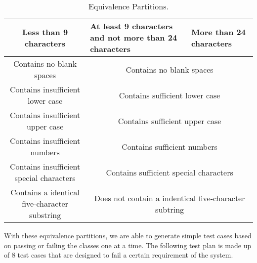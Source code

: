 \documentclass[12pt,letterpaper]{article}
\begin{document}
\begin{table}[h!]
  \begin{center}
    \caption{Equivalence Partitions.}
    \label{tab:Equiv partitions}
    
    \begin{tabular}{||c|m{4cm}|m{5cm}||}
    \hline
    Less than 9 characters & At least 9 characters and not more than 24
    characters & More than 24 characters \\
    
    \hline \hline
    \multicolumn{1}{||c|}{Contains no blank spaces} & \multicolumn{2}{c||}{Contains no blank spaces} \\
    
    \hline \hline
    \multicolumn{1}{||c|}{Contains insufficient lower case} 
    & \multicolumn{2}{c||}{Contains sufficient lower case} \\
    
    \hline \hline
    \multicolumn{1}{||c|}{Contains insufficient upper case} 
    & \multicolumn{2}{c||}{Contains sufficient upper case} \\
    
    \hline \hline
    \multicolumn{1}{||c|}{Contains insufficient numbers} 
    & \multicolumn{2}{c||}{Contains sufficient numbers} \\
    
    \hline \hline
    \multicolumn{1}{||c|}{Contains insufficient special characters} 
    & \multicolumn{2}{c||}{Contains sufficient special characters} \\
    
    \hline \hline
    \multicolumn{1}{||c|}{Contains a identical five-character substring}
    & \multicolumn{2}{c||}{Does not contain a indentical five-character subtring} \\
    \hline
    \end{tabular}
  \end{center}
\end{table}

With these equivalence partitions, we are able to generate simple test cases
based on passing or failing the classes one at a time. The following test plan
is made up of 8 test cases that are designed to fail a certain requirement of
the system.
\newline
\end{document}
